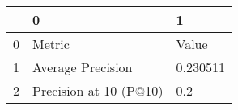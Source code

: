 \begin{tabular}{lll}
\toprule
{} &                       0 &         1 \\
\midrule
0 &                  Metric &     Value \\
1 &       Average Precision &  0.230511 \\
2 &  Precision at 10 (P@10) &       0.2 \\
\bottomrule
\end{tabular}
